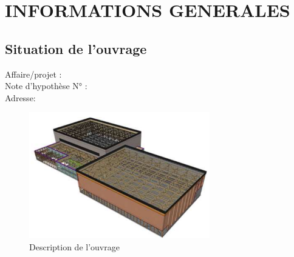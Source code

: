 \documentclass{rSIMONIN} %
\begin{document}
\pagestyle{rSIMONIN} %
\thispagestyle{empty} %
\frontpageSTB %

{
    \setcounter{tocdepth}{1} %
    \renewcommand{\contentsname}{Sommaire} %
    \tableofcontents %
}
\clearpage %


\newpage %

\chapter{INFORMATIONS GENERALES} %

\section{Situation de l'ouvrage} %

Affaire/projet : \numeroaffaire \numeroreference  \\ %
Note d'hypothèse N° : \notehypotheses \\ %
Adresse: \adresseprojet \\ %

\begin{figure}[H] %
    \centering %
    \includegraphics[width=0.7\textwidth]{input_data/situation_ouvrage.png} %
    \caption{Description de l'ouvrage} %
\end{figure}
\end{document}
